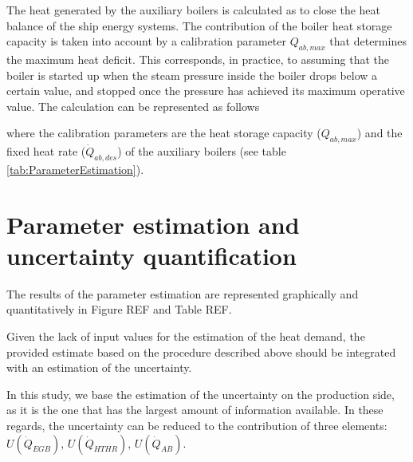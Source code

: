 \documentclass[]{article}
\begin{document}
The heat generated by the auxiliary boilers is calculated as to close the heat balance of the ship energy systems. The contribution of the boiler heat storage capacity is taken into account by a calibration parameter $Q_{ab,max}$ that determines the maximum heat deficit. This corresponds, in practice, to assuming that the boiler is started up when the steam pressure inside the boiler drops below a certain value, and stopped once the pressure has achieved its maximum operative value. The calculation can be represented as follows


	\begin{algorithmic}[1]
		\EndWhile
	\end{algorithmic}

where the calibration parameters are the heat storage capacity ($Q_{ab,max}$) and the fixed heat rate ($\dot{Q}_{ab,des}$) of the auxiliary boilers (see table \ref{tab:ParameterEstimation}).





\section{Parameter estimation and uncertainty quantification}

The results of the parameter estimation are represented graphically and quantitatively in Figure REF and Table REF. 



Given the lack of input values for the estimation of the heat demand, the provided estimate based on the procedure described above should be integrated with an estimation of the uncertainty. 

In this study, we base the estimation of the uncertainty on the production side, as it is the one that has the largest amount of information available. In these regards, the uncertainty can be reduced to the contribution of three elements: $U(\dot{Q}_{EGB})$, $U(\dot{Q}_{HTHR})$, $U(\dot{Q}_{AB})$.
\end{document}
